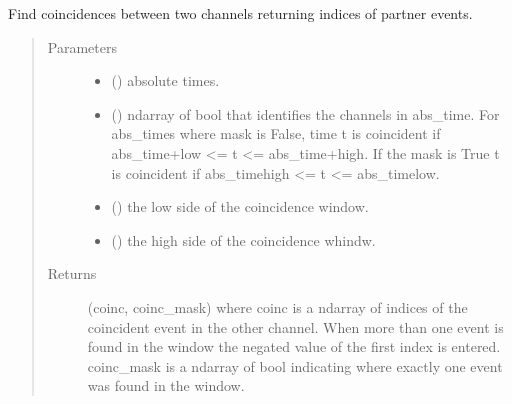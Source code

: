 \documentclass[letterpaper,10pt,english]{sphinxmanual}
\begin{document}
\begin{fulllineitems}
\label{\detokenize{tes:tes.analysis.coherent_neg_ll}}
\end{fulllineitems}


\begin{fulllineitems}
\label{\detokenize{tes:tes.analysis.coincidence}}
\sphinxAtStartPar
Find coincidences between two channels returning indices of partner events.
\begin{quote}\begin{description}
\item[{Parameters}] \leavevmode\begin{itemize}
\item {} 
\sphinxAtStartPar
{} () \textendash{} absolute times.

\item {} 
\sphinxAtStartPar
{} () \textendash{} ndarray of bool that identifies the channels in
abs\_time. For abs\_times where mask is False, time t is
coincident if abs\_time+low \textless{}= t \textless{}= abs\_time+high. If
the mask is True t is coincident if
abs\_time\sphinxhyphen{}high \textless{}= t \textless{}= abs\_time\sphinxhyphen{}low.

\item {} 
\sphinxAtStartPar
{} () \textendash{} the low side of the coincidence window.

\item {} 
\sphinxAtStartPar
{} () \textendash{} the high side of the coincidence whindw.

\end{itemize}

\item[{Returns}] \leavevmode
\sphinxAtStartPar
(coinc, coinc\_mask) where coinc is a ndarray of indices of the
coincident event in the other channel. When more than one event is
found in the window the negated value of the first index is
entered.
coinc\_mask is a ndarray of bool indicating where exactly one
event was found in the window.

\end{description}\end{quote}

\end{fulllineitems}
\end{document}
